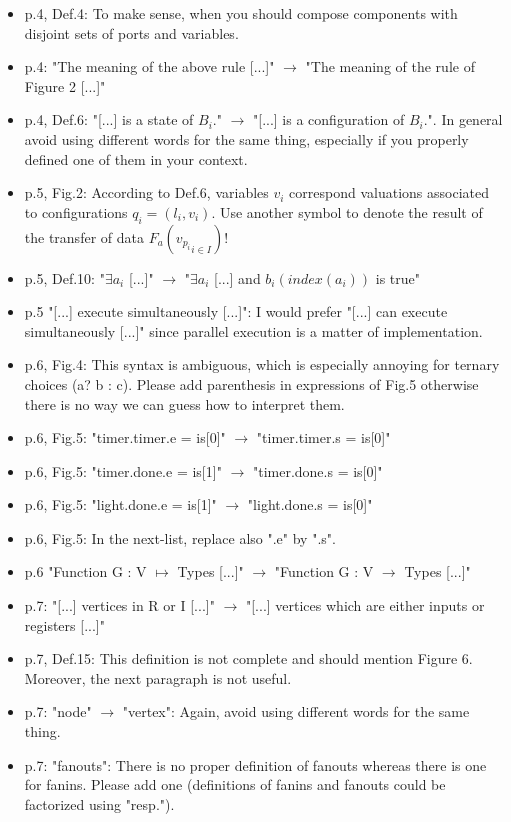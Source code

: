 \begin{itemize}
\item p.4, Def.4: To make sense, when you should compose components with disjoint 
sets of ports and variables.
\item p.4: "The meaning of the above rule [...]" $\rightarrow$ "The meaning of the rule of 
Figure 2 [...]"
\item p.4, Def.6: "[...] is a state of $B_i$." $\rightarrow$ "[...] is a configuration of 
$B_i$.". In general avoid using different words for the same thing, especially 
if you properly defined one of them in your context.
\item p.5, Fig.2: According to Def.6, variables $v_i$ correspond valuations 
associated to configurations $q_i = (l_i, v_i)$. Use another symbol to denote 
the result of the transfer of data $F_a({ v_{p_i} }_{i \in I})$!
\item p.5, Def.10: "$\exists a_i$ [...]" $\rightarrow$ "$\exists a_i$ [...] and $b_i(index(a_i))$ is 
true"
\item p.5 "[...] execute simultaneously [...]": I would prefer "[...] can execute 
simultaneously [...]" since parallel execution is a matter of implementation.
\done
{}
\item p.6, Fig.4: This syntax is ambiguous, which is especially annoying for 
ternary choices (a? b : c). Please add parenthesis in expressions of Fig.5 
otherwise there is no way we can guess how to interpret them.
\item p.6, Fig.5: "timer.timer.e = is[0]" $\rightarrow$ "timer.timer.s = is[0]"
\item p.6, Fig.5: "timer.done.e = is[1]" $\rightarrow$ "timer.done.s = is[0]"
\item p.6, Fig.5: "light.done.e = is[1]" $\rightarrow$ "light.done.s = is[0]"
\item p.6, Fig.5: In the next-list, replace also ".e" by ".s".
\item p.6 "Function G : V $\mapsto$ Types [...]" $\rightarrow$ "Function G : V $\to$ Types 
[...]"
\item p.7: "[...] vertices in R or I [...]" $\rightarrow$ "[...] vertices which are either 
inputs or registers [...]"
\item p.7, Def.15: This definition is not complete and should mention Figure 6. 
Moreover, the next paragraph is not useful.
\item p.7: "node" $\rightarrow$ "vertex": Again, avoid using different words for the same 
thing.
\item p.7: "fanouts": There is no proper definition of fanouts whereas there is 
one for fanins. Please add one (definitions of fanins and fanouts could be 
factorized using "resp.").
\done
{}


\end{itemize}

